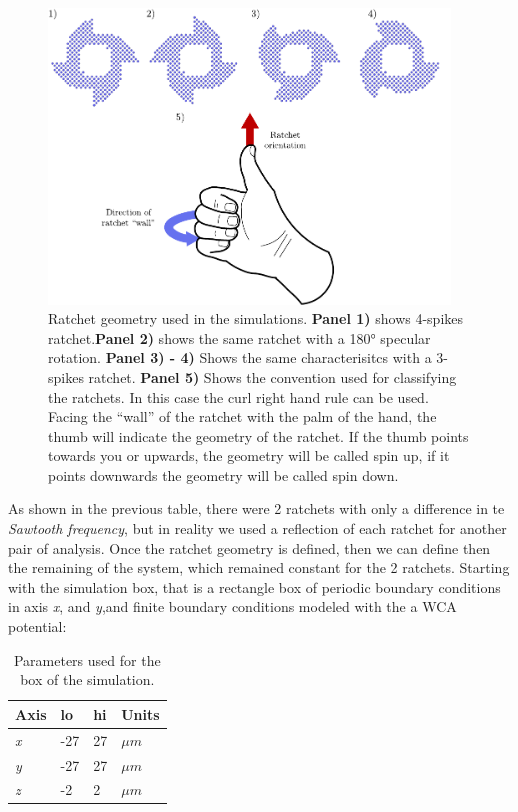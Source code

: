 \begin{figure}
  \begin{center}
    \includegraphics[width=0.95\textwidth]{figures/ratchet.pdf}
  \end{center}
  \caption[Ratchet geomety.]{Ratchet geometry used in the simulations. \textbf{Panel 1)} shows 4-spikes ratchet.\textbf{Panel 2)} shows the same ratchet with a 180° specular rotation. \textbf{Panel 3) - 4)} Shows the same characterisitcs with a 3-spikes ratchet. \textbf{ Panel 5)} Shows the convention used for classifying the ratchets. In this case the curl right hand rule can be used. Facing the ``wall'' of the ratchet with the palm of the hand, the thumb will indicate the geometry of the ratchet. If the thumb points towards you or upwards, the geometry will be called spin up, if it points downwards the geometry will be called spin down.}\label{fig:ratchetgeometry}
\end{figure}


As shown in the previous table, there were 2 ratchets with only a difference in te \textit{Sawtooth frequency}, but in reality we used a reflection of each ratchet for another pair of analysis. Once the ratchet geometry is defined, then we can define then the remaining of the system, which remained constant for the 2 ratchets. Starting with the simulation box, that is a rectangle box of periodic boundary conditions in axis \textit{x}, and \textit{y},and finite boundary conditions modeled with the a WCA potential:



\begin{table}[H]
\centering
\caption[Simulation box physical parameters.]{Parameters used for the box of the simulation.}
\begin{tabular}{l l l l}
\hline
Axis & lo  & hi & Units \\
\hline
\textit{x} & -27 & 27 & \( \mu m\) \\
\textit{y} & -27 & 27 & \( \mu m\) \\
\textit{z} & -2  & 2   & \( \mu m\)\\ 
\hline
\end{tabular}
\end{table}


